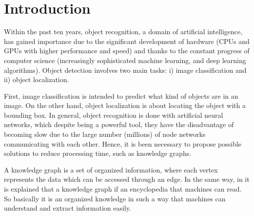 \section{Introduction}
Within the past ten years, object recognition, a domain of artificial intelligence, has gained importance due to the significant development of hardware (CPUs and GPUs with higher performance and speed) and thanks to the constant progress of computer science (increasingly sophisticated machine learning, and deep learning algorithms). Object detection involves two main tasks: i) image classification and ii) object localization.

First, image classification is intended to predict what kind of objects are in an image. On the other hand, object localization is about locating the object with a bounding box. In general, object recognition is done with artificial neural networks, which despite being a powerful tool, they have the disadvantage of becoming slow due to the large number (millions) of node networks communicating with each other. Hence, it is been necessary to propose possible solutions to reduce processing time, such as knowledge graphs.

A knowledge graph is a set of organized information, where each vertex represents the data which can be accessed through an edge. In the same way, in \cite{Barnard} it is explained that a knowledge graph if an encyclopedia that machines can read. So basically it is an organized knowledge in such a way that machines can understand and extract information easily.

